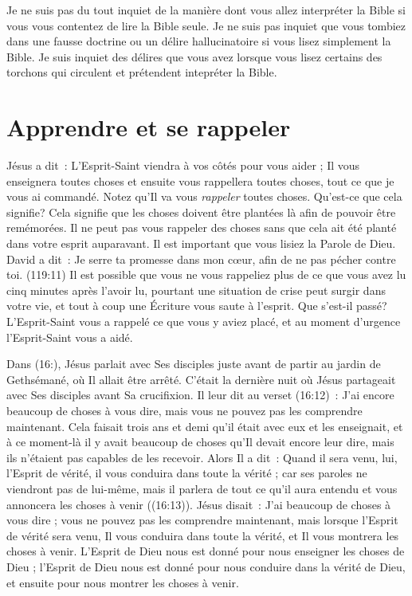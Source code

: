 Je ne suis pas du tout inquiet de la manière dont vous allez interpréter
 la Bible si vous vous contentez de lire la Bible seule.
 Je ne suis pas inquiet que vous tombiez dans une fausse doctrine
 ou un délire hallucinatoire si vous lisez simplement la Bible.
 Je suis inquiet des délires que vous avez lorsque vous lisez certains
 des torchons qui circulent et prétendent intepréter la Bible.


\section*{Apprendre et se rappeler}

Jésus a dit~: \og L'Esprit-Saint viendra à vos côtés pour vous aider ;
 Il vous enseignera toutes choses et ensuite vous rappellera toutes choses,
 tout ce que je vous ai commandé. \fg{}
 Notez qu'Il va vous \emph{rappeler} toutes choses.
 Qu'est-ce que cela signifie? Cela signifie que les choses
 doivent être plantées là afin de pouvoir être remémorées.
 Il ne peut pas vous rappeler des choses sans que cela ait été planté
 dans votre esprit auparavant. Il est important que vous lisiez
 la Parole de Dieu. David a dit~: \og Je serre ta promesse dans mon cœur,
 afin de ne pas pécher contre toi. \fg{} (119:11)
 Il est possible que vous ne vous rappeliez plus de ce que vous avez lu
 cinq minutes après l'avoir lu, pourtant une situation de crise
 peut surgir dans votre vie, et tout à coup une Écriture vous saute
 à l'esprit. Que s'est-il passé? L'Esprit-Saint vous a rappelé
 ce que vous y aviez placé, et au moment d'urgence l'Esprit-Saint
 vous a aidé.

Dans (16:), Jésus parlait avec Ses disciples juste avant
 de partir au jardin de Gethsémané, où Il allait être arrêté.
 C'était la dernière nuit où Jésus partageait avec Ses disciples
 avant Sa crucifixion.
 Il leur dit au verset (16:12)~:
 \og J'ai encore beaucoup de choses à vous dire,
 mais vous ne pouvez pas les comprendre maintenant. \fg{}
 Cela faisait trois ans et demi qu'il était avec eux et les enseignait,
 et à ce moment-là il y avait beaucoup de choses qu'Il devait encore
 leur dire, mais ils n'étaient pas capables de les recevoir.
 Alors Il a dit~: \og Quand il sera venu, lui, l'Esprit de vérité,
 il vous conduira dans toute la vérité ; car ses paroles ne viendront pas
 de lui-même, mais il parlera de tout ce qu'il aura entendu et vous annoncera
 les choses à venir \fg{} ((16:13)).
 Jésus disait~: \og J'ai beaucoup de choses à vous dire ; vous ne pouvez pas
 les comprendre maintenant, mais lorsque l'Esprit de vérité sera venu,
 Il vous conduira dans toute la vérité, et Il vous montrera les choses
 à venir. \fg{}
 L'Esprit de Dieu nous est donné pour nous enseigner les choses de Dieu ;
 l'Esprit de Dieu nous est donné pour nous conduire dans la vérité de Dieu,
 et ensuite pour nous montrer les choses à venir.


